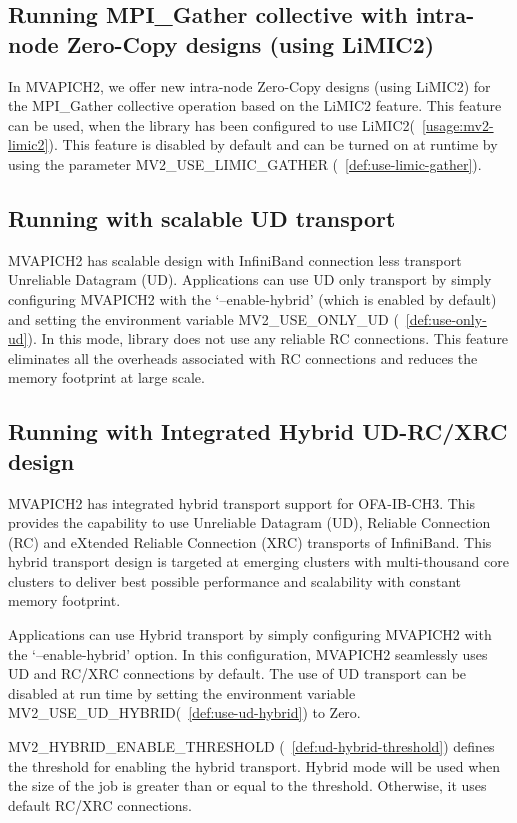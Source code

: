\subsection{Running MPI\_Gather collective with intra-node Zero-Copy  designs (using LiMIC2)}
\label{subsec:coll-mcast}
In MVAPICH2, we offer new intra-node Zero-Copy designs (using LiMIC2) for the MPI\_Gather collective operation based
on the LiMIC2 feature. This feature can be used, when the library has been
configured to use LiMIC2(~\ref{usage:mv2-limic2}). This feature is disabled by
default and can be turned on at runtime by using the parameter
MV2\_USE\_LIMIC\_GATHER (~\ref{def:use-limic-gather}).

\subsection{Running with scalable UD transport}
\label{subsec:mpi-ud}
MVAPICH2 has scalable design with InfiniBand connection less transport
Unreliable Datagram (UD). Applications can use UD only transport by
simply configuring MVAPICH2 with the ‘--enable-hybrid’ (which is enabled
by default) and setting the environment 
variable MV2\_USE\_ONLY\_UD (~\ref{def:use-only-ud}).
In this mode, library does not use any reliable RC connections.
This feature eliminates all the overheads associated with RC connections
and reduces the memory footprint at large scale.

\subsection{Running with Integrated Hybrid UD-RC/XRC design}
\label{subsec:mpi-hybrid}
MVAPICH2 has integrated hybrid transport support for OFA-IB-CH3.
This provides the capability to use Unreliable Datagram (UD),
Reliable Connection (RC) and eXtended Reliable Connection (XRC)
transports of InfiniBand. This hybrid transport design is targeted at emerging
clusters with multi-thousand core clusters to deliver best possible
performance and scalability with constant memory footprint.

Applications can use Hybrid transport by simply configuring MVAPICH2
with the ‘--enable-hybrid’ option.  In this configuration, MVAPICH2
seamlessly uses UD and RC/XRC connections by default. The use of UD
transport can be disabled at run time by setting the environment variable
MV2\_USE\_UD\_HYBRID(~\ref{def:use-ud-hybrid}) to Zero.

MV2\_HYBRID\_ENABLE\_THRESHOLD (~\ref{def:ud-hybrid-threshold})
defines the threshold for enabling the hybrid transport.
Hybrid mode will be used when the size of the job is greater than
or equal to the threshold. Otherwise, it uses default RC/XRC connections.

